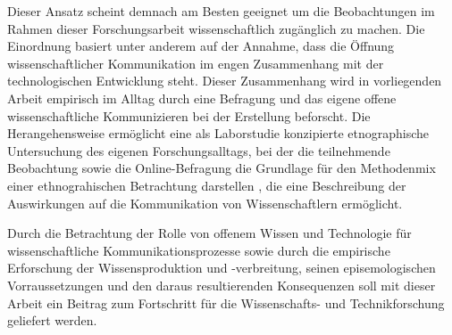 Dieser Ansatz scheint demnach am Besten geeignet um die Beobachtungen im Rahmen dieser Forschungsarbeit wissenschaftlich zugänglich zu machen. Die Einordnung basiert unter anderem auf der Annahme, dass die Öffnung wissenschaftlicher Kommunikation im engen Zusammenhang mit der technologischen Entwicklung steht. Dieser Zusammenhang wird in vorliegenden Arbeit empirisch im Alltag durch eine Befragung und das eigene offene wissenschaftliche Kommunizieren bei der Erstellung beforscht. Die Herangehensweise ermöglicht eine als Laborstudie konzipierte etnographische Untersuchung des eigenen Forschungsalltags, bei der die teilnehmende Beobachtung sowie die Online-Befragung die Grundlage für den Methodenmix einer ethnograhischen Betrachtung darstellen \cite{bachmann_2011_ethnographie}, die eine Beschreibung der Auswirkungen auf die Kommunikation von Wissenschaftlern ermöglicht.

Durch die Betrachtung der Rolle von offenem Wissen und Technologie für wissenschaftliche Kommunikationsprozesse sowie durch die empirische Erforschung der Wissensproduktion und -verbreitung, seinen episemologischen Vorraussetzungen und den daraus resultierenden Konsequenzen \cite{beck_2014_science} soll mit dieser Arbeit ein Beitrag zum Fortschritt für die Wissenschafts- und Technikforschung geliefert werden.
